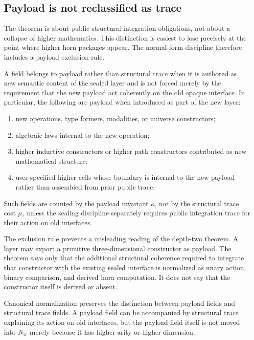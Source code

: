 \documentclass{lmcs}
\begin{document}
\subsection{Payload is not reclassified as trace}

The theorem is about public structural integration obligations, not about a collapse of
higher mathematics.  This distinction is easiest to lose precisely at the point where higher
horn packages appear.  The normal-form discipline therefore includes a payload exclusion
rule.

\begin{defi}
A field belongs to payload rather than structural trace when it is authored as new semantic
content of the sealed layer and is not forced merely by the requirement that the new payload
act coherently on the old opaque interface.  In particular, the following are payload when
introduced as part of the new layer:
\begin{enumerate}
\item new operations, type formers, modalities, or universe constructors;
\item algebraic laws internal to the new operation;
\item higher inductive constructors or higher path constructors contributed as new
mathematical structure;
\item user-specified higher cells whose boundary is internal to the new payload rather than
assembled from prior public trace.
\end{enumerate}
Such fields are counted by the payload invariant \(\kappa\), not by the structural trace cost
\(\mu\), unless the sealing discipline separately requires public integration trace for their
action on old interfaces.
\end{defi}

The exclusion rule prevents a misleading reading of the depth-two theorem.  A layer may
export a primitive three-dimensional constructor as payload.  The theorem says only that the
additional structural coherence required to integrate that constructor with the existing
sealed interface is normalized as unary action, binary comparison, and derived horn
computation.  It does not say that the constructor itself is derived or absent.

\begin{lem}
Canonical normalization preserves the distinction between payload fields and structural trace
fields.  A payload field can be accompanied by structural trace explaining its action on old
interfaces, but the payload field itself is not moved into \(N_{\mathrm{tr}}\) merely because it
has higher arity or higher dimension.
\end{lem}
\end{document}
